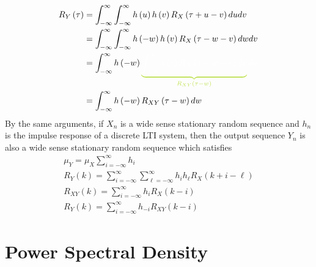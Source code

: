 \documentclass[11pt]{report} %
\begin{document}
\begin{align}
R_{Y}\left(\tau\right) &= \int_{-\infty}^{\infty}\int_{-\infty}^{\infty}h\left(u\right)h\left(v\right)R_{X}\left(\tau+u-v\right)dudv \\
&= \int_{-\infty}^{\infty}\int_{-\infty}^{\infty}h\left(-w\right)h\left(v\right)R_{X}\left(\tau-w-v\right)dwdv \\
&= \int_{-\infty}^{\infty}h\left(-w\right)\green\underbrace{\black\int_{-\infty}^{\infty}h\left(v\right)R_{X}\left(\tau-w-v\right)dv}_{\green R_{XY}\left(\tau-w\right)}\black dw \\
&= \int_{-\infty}^{\infty}h\left(-w\right)R_{XY}\left(\tau-w\right)dw
\end{align}
By the same arguments, if $X_{n}$ is a wide sense stationary random sequence and $h_{n}$ is the impulse response of a discrete LTI system, then the output sequence $Y_{n}$ is also a wide sense stationary random sequence which satisfies
\begin{gather}
\mu_{Y} = \mu_{X}\sum_{i = -\infty}^{\infty}h_{i} \\
R_{Y}\left(k\right) = \sum_{i = -\infty}^{\infty}\sum_{\ell = -\infty}^{\infty}h_{i}h_{\ell}R_{X}\left(k + i - \ell\right) \\
R_{XY}\left(k\right) = \sum_{i = -\infty}^{\infty}h_{i}R_{X}\left(k - i\right) \\
R_{Y}\left(k\right) = \sum_{i = -\infty}^{\infty}h_{-i}R_{XY}\left(k - i\right)
\end{gather}

\section{Power Spectral Density}
\end{document}
